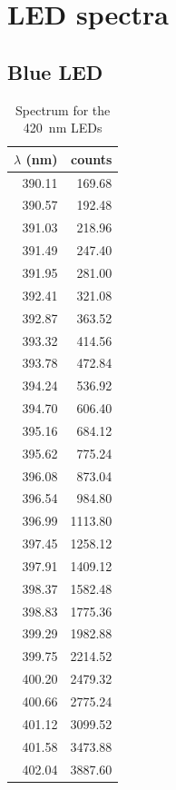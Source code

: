 \section{LED spectra}
\label{app:led_spectra}
\subsection*{Blue LED}
\begin{table}[!h]
\centering
\caption{Spectrum for the 420~nm LEDs}
\label{tab:led_uv}
\begin{tabular}{rr}
\toprule
 $\lambda$ (nm) &    counts \\
\midrule
          390.11 &    169.68 \\
          390.57 &    192.48 \\
          391.03 &    218.96 \\
          391.49 &    247.40 \\
          391.95 &    281.00 \\
          392.41 &    321.08 \\
          392.87 &    363.52 \\
          393.32 &    414.56 \\
          393.78 &    472.84 \\
          394.24 &    536.92 \\
          394.70 &    606.40 \\
          395.16 &    684.12 \\
          395.62 &    775.24 \\
          396.08 &    873.04 \\
          396.54 &    984.80 \\
          396.99 &   1113.80 \\
          397.45 &   1258.12 \\
          397.91 &   1409.12 \\
          398.37 &   1582.48 \\
          398.83 &   1775.36 \\
          399.29 &   1982.88 \\
          399.75 &   2214.52 \\
          400.20 &   2479.32 \\
          400.66 &   2775.24 \\
          401.12 &   3099.52 \\
          401.58 &   3473.88 \\
          402.04 &   3887.60 \\

\end{tabular}
\end{table}
